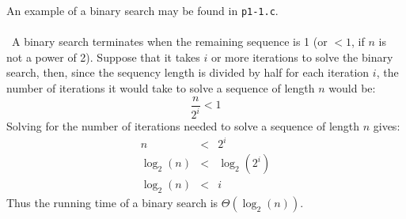An example of a binary search may be found in \texttt{p1-1.c}.
\\ \\
\noindent~A binary search terminates when the remaining sequence is 1 (or $< 1$, if $n$ is not a power of 2). Suppose that it takes $i$ or more iterations to solve the binary search, then, since the sequency length is divided by half for each iteration $i$, the number of iterations it would take to solve a sequence of length $n$ would be:
\begin{equation*}
	\frac{n}{2^i} < 1
\end{equation*}
Solving for the number of iterations needed to solve a sequence of length $n$ gives:
\begin{eqnarray*}
	n & < & 2^i \\
	\log_2(n) & < & \log_2(2^i) \\
	\log_2(n) & < & i
\end{eqnarray*}
Thus the running time of a binary search is $\Theta(\log_2(n))$.
